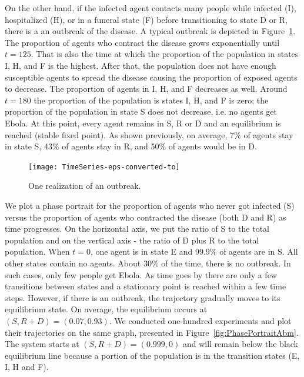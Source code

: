 
On the other hand, if the infected agent contacts many people while infected (I), hospitalized (H), or in a funeral state (F) before transitioning to state D or R, there is a an outbreak of the disease. A typical outbreak is depicted in Figure~\ref{fig:Outbreak}. The proportion of agents who contract the disease grows exponentially until $t = 125$. That is also the time at which the proportion of the population in states I, H, and F is the highest. After that, the population does not have enough susceptible agents to spread the disease causing the proportion of exposed agents to decrease. The proportion of agents in I, H, and F decreases as well. Around $t = 180$ the proportion of the population is states I, H, and F is zero; the proportion of the population in state S does not decrease, i.e. no agents get Ebola. At this point, every agent remains in S, R or D and an equilibrium is reached (stable fixed point). As shown previously, on average, 7\% of agents stay in state S, 43\% of agents stay in R, and 50\% of agents would be in D. %
\begin{figure}[h!]
\begin{center}
\texttt{[image: TimeSeries-eps-converted-to]}
\end{center}
\caption{One realization of an outbreak.}
\label{fig:Outbreak}
\end{figure}


We plot a phase portrait for the proportion of agents who never got infected (S) versus the proportion of agents who contracted the disease (both D and R) as time progresses. On the horizontal axis, we put the ratio of S to the total population and on the vertical axis - the ratio of D plus R to the total population.  When $t = 0$, one agent is in state E and 99.9\% of agents are in S. All other states contain no agents. About 30\% of the time, there is no outbreak. In such cases, only few people get Ebola. As time goes by there are only a few transitions between states and a stationary point is reached within a few time steps. However, if there is an outbreak, the trajectory gradually moves to its equilibrium state. On average, the equilibrium occurs at $(S, R+ D) = (0.07, 0.93)$. We conducted one-hundred experiments and plot their trajectories on the same graph, presented in Figure~\ref{fig:PhasePortraitAbm}. The system starts at $(S, R+D) = (0.999, 0)$ and will remain below the black equilibrium line because a portion of the population is in the transition states (E, I, H and F). 

